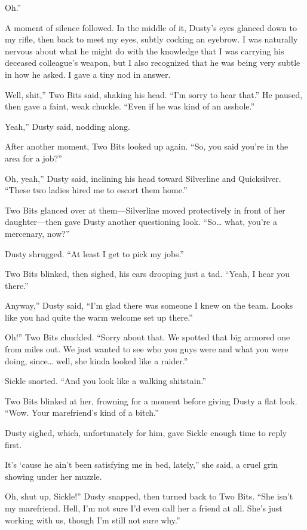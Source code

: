 \leavevmode{}Oh.”

A moment of silence followed. In the middle of it, Dusty’s eyes glanced down to my rifle, then back to meet my eyes, subtly cocking an eyebrow. I was naturally nervous about what he might do with the knowledge that I was carrying his deceased colleague’s weapon, but I also recognized that he was being very subtle in how he asked. I gave a tiny nod in answer.

\leavevmode{}Well, shit,” Two Bits said, shaking his head. “I’m sorry to hear that.” He paused, then gave a faint, weak chuckle. “Even if he was kind of an asshole.”

\leavevmode{}Yeah,” Dusty said, nodding along.

After another moment, Two Bits looked up again. “So, you said you’re in the area for a job?”

\leavevmode{}Oh, yeah,” Dusty said, inclining his head toward Silverline and Quicksilver. “These two ladies hired me to escort them home.”

Two Bits glanced over at them—Silverline moved protectively in front of her daughter—then gave Dusty another questioning look. “So… what, you’re a mercenary, now?”

Dusty shrugged. “At least I get to pick my jobs.”

Two Bits blinked, then sighed, his ears drooping just a tad. “Yeah, I hear you there.”

\leavevmode{}Anyway,” Dusty said, “I’m glad there was someone I knew on the team. Looks like you had quite the warm welcome set up there.”

\leavevmode{}Oh!” Two Bits chuckled. “Sorry about that. We spotted that big armored one from miles out. We just wanted to see who you guys were and what you were doing, since… well, she kinda looked like a raider.”

Sickle snorted. “And you look like a walking shitstain.”

Two Bits blinked at her, frowning for a moment before giving Dusty a flat look. “Wow. Your marefriend’s kind of a bitch.”

Dusty sighed, which, unfortunately for him, gave Sickle enough time to reply first.

\leavevmode{}It’s ‘cause he ain’t been satisfying me in bed, lately,” she said, a cruel grin showing under her muzzle.

\leavevmode{}Oh, shut up, Sickle!” Dusty snapped, then turned back to Two Bits. “She isn’t my marefriend. Hell, I’m not sure I’d even call her a friend at all. She’s just working with us, though I’m still not sure why.”

